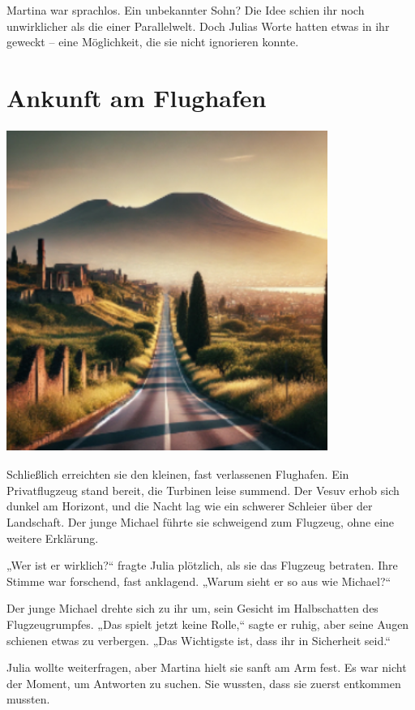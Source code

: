 \documentclass[
]{article}
\begin{document}
Martina war sprachlos. Ein unbekannter Sohn? Die Idee schien ihr noch
unwirklicher als die einer Parallelwelt. Doch Julias Worte hatten etwas
in ihr geweckt -- eine Möglichkeit, die sie nicht ignorieren konnte.

\section{Ankunft am Flughafen}\label{ankunft-am-flughafen}

\includegraphics[width=4.1232in,height=4.14371in]{media/image2.png}

Schließlich erreichten sie den kleinen, fast verlassenen Flughafen. Ein
Privatflugzeug stand bereit, die Turbinen leise summend. Der Vesuv erhob
sich dunkel am Horizont, und die Nacht lag wie ein schwerer Schleier
über der Landschaft. Der junge Michael führte sie schweigend zum
Flugzeug, ohne eine weitere Erklärung.

„Wer ist er wirklich?{\kern0pt}`` fragte Julia plötzlich, als sie das
Flugzeug betraten. Ihre Stimme war forschend, fast anklagend. „Warum
sieht er so aus wie Michael?{\kern0pt}``

Der junge Michael drehte sich zu ihr um, sein Gesicht im Halbschatten
des Flugzeugrumpfes. „Das spielt jetzt keine Rolle,`` sagte er ruhig,
aber seine Augen schienen etwas zu verbergen. „Das Wichtigste ist, dass
ihr in Sicherheit seid.``

Julia wollte weiterfragen, aber Martina hielt sie sanft am Arm fest. Es
war nicht der Moment, um Antworten zu suchen. Sie wussten, dass sie
zuerst entkommen mussten.
\end{document}
